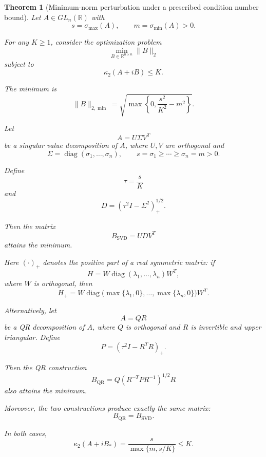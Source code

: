 \documentclass[11pt, reqno, a4paper]{amsart}
\theoremstyle{plain}
\newtheorem{theorem}{Theorem}[section]
\theoremstyle{definition}
\theoremstyle{remark}
\numberwithin{equation}{section}
\begin{document}
\begin{theorem}[Minimum-norm perturbation under a prescribed condition number bound]

Let $A\in GL_n(\mathbb{R})$ with
\[
s=\sigma_{\max}(A),
\qquad
m=\sigma_{\min}(A)>0.
\]

For any $K\geq1$, consider the optimization problem
\[
\min_{B\in\mathbb{R}^{n\times n}}\|B\|_2
\]
subject to
\[
\kappa_2(A+iB)\leq K.
\]

The minimum is
\[
\boxed{
\|B\|_{2,\min}
=
\sqrt{
\max\left\{
0,\frac{s^2}{K^2}-m^2
\right\}
}.
}
\]

Let
\[
A=U\Sigma V^T
\]
be a singular value decomposition of $A$, where $U,V$ are
orthogonal and
\[
\Sigma=\operatorname{diag}(\sigma_1,\ldots,\sigma_n),
\qquad
s=\sigma_1\geq\cdots\geq\sigma_n=m>0.
\]

Define
\[
\tau=\frac{s}{K}
\]
and
\[
D=
\left(
\tau^2I-\Sigma^2
\right)_+^{1/2}.
\]

Then the matrix
\[
\boxed{
B_{\mathrm{SVD}}=UDV^T
}
\]
attains the minimum.

Here $(\cdot)_+$ denotes the positive part of a real symmetric
matrix: if
\[
H=W\operatorname{diag}(\lambda_1,\ldots,\lambda_n)W^T,
\]
where $W$ is orthogonal, then
\[
H_+
=
W\operatorname{diag}
\bigl(
\max\{\lambda_1,0\},\ldots,
\max\{\lambda_n,0\}
\bigr)W^T.
\]

Alternatively, let
\[
A=QR
\]
be a QR decomposition of $A$, where $Q$ is orthogonal and $R$
is invertible and upper triangular. Define
\[
P=
\left(
\tau^2I-R^TR
\right)_+.
\]

Then the QR construction
\[
\boxed{
B_{\mathrm{QR}}
=
Q(R^{-T}PR^{-1})^{1/2}R
}
\]
also attains the minimum.

Moreover, the two constructions produce exactly the same
matrix:
\[
\boxed{
B_{\mathrm{QR}}=B_{\mathrm{SVD}}.
}
\]

In both cases,
\[
\boxed{
\kappa_2(A+iB_*)
=
\frac{s}{\max\{m,s/K\}}
\leq K.
}
\]

\end{theorem}
\end{document}
